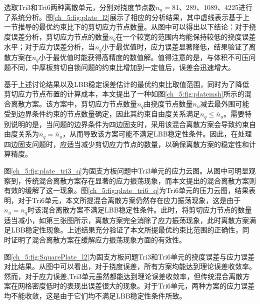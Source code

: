 选取Tri3和Tri6两种离散单元，分别对挠度节点数$n_u=$81、289、1089、4225进行了系统分析。图\ref{ch_5:fig:plate_l2}展示了相应的分析结果，其中虚线表示基于上一节推导的最优约束比下的剪切应力节点数量。从图中可以得出以下结论：对于挠度误差分析，剪切应力节点的数量$n_q$在一个较宽的范围内均能保持较低的挠度误差水平；对于应力误差分析，当$n_q$小于最优值时，应力误差显著降低，结果验证了离散方案在$n_q$小于最优值时能获得高精度的数值解。值得注意的是，与体积不可压问题不同，中厚板剪切自锁问题的约束比增加到一定值后，误差会迅速增大。

基于上述讨论结果以及LBB稳定误差估计的最优约束比取值范围，同时为了降低剪切应力节点布置的计算成本，本文提出了一种如图\ref{ch_5:fig:platemsh}所示的混合离散方案。该方案中，剪切应力节点数量$n_q$由挠度节点数量$n_u$减去最外围可能受到边界条件约束的节点数量确定，因此其约束自由度关系满足$n_q\leq \bar{n}_u$。需要特别说明的是，当问题的边界条件为四边固支时，采用该混合离散方案会导致约束自由度关系为$n_q = \bar{n}_u$，从而导致该方案可能不满足LBB稳定性条件。因此，在处理四边固支问题时，应适当减少剪切应力节点的数量，以确保离散方案的稳定性和计算精度。

图\ref{ch_5:fig:plate_tri3_q}为固支方板问题中Tri3单元的应力云图。从图中可明显观察到，传统混合离散方案存在显著的应力振荡现象，而本文提出的混合离散方案则有效的缓解了这一现象。图\ref{ch_5:fig:plate_tri6_q}为Tri6单元的压力云图，结果表明，对于Tri6单元，本文所提混合离散方案仍然存在应力振荡现象，这是由于$n_u=n_q$时该混合离散方案不满足LBB稳定性条件。此时，将剪切应力节点的数量适当减小，如第三张图所示，离散方案完全消除了应力振荡现象，此时离散方案满足LBB稳定性现象。上述结果充分验证了本文所提最优约束比范围的正确性，同时证明了混合离散方案在缓解应力振荡现象方面的有效性。

图\ref{ch_5:fig:SquarePlate_l2}为固支方板问题Tri3和Tri6单元的挠度误差与应力误差对比结果。从图中可以看出，对于挠度误差，所有方案均能达到理论误差收敛率。然而，对于应力误差,Tri3单元虽然都能达到理论误差收敛率，但传统混合离散方案在网格密度低时的表现出误差很大的现象。对于Tri6单元，两种方案的应力误差均不能收敛，这是由于它们均不满足LBB稳定性条件所致。

